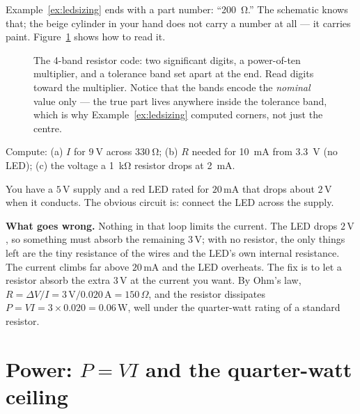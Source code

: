 Example~\ref{ex:ledsizing} ends with a part number: ``\qty{200}{\ohm}.''
The schematic knows that; the beige cylinder in your hand does not carry a
number at all — it carries paint. Figure~\ref{fig:colorcode} shows how to
read it.

\begin{figure}[htbp]
\centering

\caption{The 4-band resistor code: two significant digits, a power-of-ten
multiplier, and a tolerance band set apart at the end. Read digits toward
the multiplier. Notice that the bands encode the \emph{nominal} value only —
the true part lives anywhere inside the tolerance band, which is why
Example~\ref{ex:ledsizing} computed corners, not just the centre.}
\label{fig:colorcode}
\end{figure}

\begin{exercise}[easy]
Compute: (a) $I$ for $\qty{9}{\volt}$ across $\qty{330}{\ohm}$;
(b) $R$ needed for \qty{10}{\milli\ampere} from \qty{3.3}{\volt} (no LED);
(c) the voltage a \qty{1}{\kilo\ohm} resistor drops at \qty{2}{\milli\ampere}.
\end{exercise}

\begin{example}\label{ex:naive-led}
You have a $5\,\mathrm{V}$ supply and a red LED rated for $20\,\mathrm{mA}$ that drops about
$2\,\mathrm{V}$ when it conducts. The obvious circuit is: connect the LED across the supply.
\par\smallskip
\textbf{What goes wrong.} Nothing in that loop limits the current. The LED drops $2\,\mathrm{V}$,
so something must absorb the remaining $3\,\mathrm{V}$; with no resistor, the only things left are the
tiny resistance of the wires and the LED's own internal resistance. The current climbs far above
$20\,\mathrm{mA}$ and the LED overheats. The fix is to let a resistor absorb the extra $3\,\mathrm{V}$ at the
current you want. By Ohm's law, $R=\Delta V/I=3\,\mathrm{V}/0.020\,\mathrm{A}=150\,\Omega$, and the resistor
dissipates $P=VI=3\times0.020=0.06\,\mathrm{W}$, well under the quarter-watt rating of a standard resistor.
\end{example}

\section{Power: $P=VI$ and the quarter-watt ceiling}
\label{sec:power}

